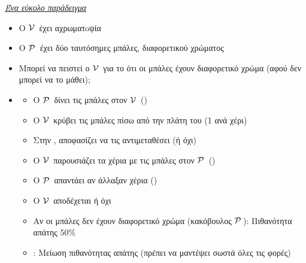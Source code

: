 \documentclass[10pt,handout]{beamer}
\begin{document}
\begin{frame}{\textit{\href{http://mathoverflow.net/questions/22624/example-of-a-good-zero-knowledge-proof}{Ένα εύκολο παράδειγμα}}}
\begin{small}
\begin{itemize}
\setlength \itemsep{0.01pt}
\item Ο $\mathcal{V}\,$ έχει αχρωματoψία
\pause
\item O $\mathcal{P}\,$ έχει δύο ταυτόσημες μπάλες, διαφορετικού χρώματος
\pause
\item Μπορεί να πειστεί ο $\mathcal{V}\,$ για το ότι οι μπάλες έχουν διαφορετικό χρώμα (\alert{αφού δεν μπορεί να το μάθει});
\pause
\item {}
\begin{itemize}
\item Ο $\mathcal{P}\,$ δίνει τις μπάλες στον $\mathcal{V}\,$ ()
\item Ο $\mathcal{V}\,$ κρύβει τις μπάλες πίσω από την πλάτη του (1 ανά χέρι)
\pause
\item Στην , αποφασίζει να τις αντιμεταθέσει (ή όχι)
\pause
\item O $\mathcal{V}\,$ παρουσιάζει τα χέρια με τις μπάλες στον $\mathcal{P}\,$ ()
\pause
\item Ο $\mathcal{P}\,$ απαντάει αν άλλαξαν χέρια ()
\pause
\item Ο $\mathcal{V}\,$ αποδέχεται ή όχι
\pause
\item Αν οι μπάλες \alert{δεν} έχουν διαφορετικό χρώμα (κακόβουλος $\mathcal{P}\,$): Πιθανότητα απάτης $50\%$
\pause
\item {}: Μείωση πιθανότητας απάτης (πρέπει να μαντέψει σωστά όλες τις φορές)
\end{itemize}
\end{itemize}
\end{small}
\end{frame}
\end{document}
